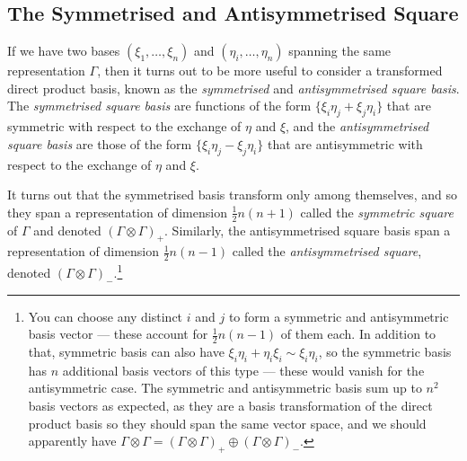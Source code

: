 \documentclass{article}
\theoremstyle{plain}\theoremheaderfont{\normalfont\itshape}\theorembodyfont{\rmfamily}\theoremseparator{.}\newtheorem*{rem}{Remark}\newtheorem*{ex}{Example}\newtheorem*{proof}{Proof}\newtheorem*{altp}{Alternative proof}
\theoremstyle{plain}\theoremheaderfont{\normalfont\bfseries}\theorembodyfont{\rmfamily}\theoremseparator{.}\newtheorem{thm}{Theorem}[section]\newtheorem{lem}[thm]{Lemma}\newtheorem{prop}[thm]{Proposition}\newtheorem*{cor}{Corollary}\newtheorem{defn}[thm]{Definition}\newtheorem{clm}[thm]{Claim}\newtheorem{clminproof}{Claim}\newtheorem*{law}{Law}\newtheorem{pos}[thm]{Postulate}
\theoremstyle{break}\theoremheaderfont{\normalfont\itshape}\theorembodyfont{\rmfamily}\theoremseparator{.\medskip}\newtheorem*{proofskip}{Proof}\newtheorem*{exs}{Examples}\newtheorem*{rems}{Remarks}
\theoremstyle{break}\theoremheaderfont{\normalfont\bfseries}\theorembodyfont{\rmfamily}\theoremseparator{.\medskip}\newtheorem{lemskip}[thm]{Lemma}\newtheorem{defnskip}[thm]{Definition}\newtheorem{propskip}[thm]{Proposition}\newtheorem{thmskip}[thm]{Theorem}
\numberwithin{equation}{section}
\begin{document}
    \subsection{The Symmetrised and Antisymmetrised Square}
    If we have two bases \((\xi_1,\dots,\xi_n)\) and \((\eta_i,\dots,\eta_n)\) spanning the same representation \(\Gamma\), then it turns out to be more useful to consider a transformed direct product basis, known as the \textit{symmetrised} and \textit{antisymmetrised square basis}. The \textit{symmetrised square basis} are functions of the form \(\{\xi_i\eta_j+\xi_j\eta_i\}\) that are symmetric with respect to the exchange of \(\eta\) and \(\xi\), and the \textit{antisymmetrised square basis} are those of the form \(\{\xi_i\eta_j-\xi_j\eta_i\}\) that are antisymmetric with respect to the exchange of \(\eta\) and \(\xi\).

    It turns out that the symmetrised basis transform only among themselves, and so they span a representation of dimension \(\frac{1}{2}n(n+1)\) called the \textit{symmetric square} of \(\Gamma\) and denoted \((\Gamma\otimes\Gamma)_+\). Similarly, the antisymmetrised square basis span a representation of dimension \(\frac{1}{2}n(n-1)\) called the \textit{antisymmetrised square}, denoted \((\Gamma\otimes\Gamma)_-\).\footnote{You can choose any distinct \(i\) and \(j\) to form a symmetric and antisymmetric basis vector --- these account for \(\frac{1}{2}n(n-1)\) of them each. In addition to that, symmetric basis can also have \(\xi_i\eta_i+\eta_i\xi_i\sim\xi_i\eta_i\), so the symmetric basis has \(n\) additional basis vectors of this type --- these would vanish for the antisymmetric case. The symmetric and antisymmetric basis sum up to \(n^2\) basis vectors as expected, as they are a basis transformation of the direct product basis so they should span the same vector space, and we should apparently have \(\Gamma\otimes\Gamma=(\Gamma\otimes\Gamma)_+\oplus(\Gamma\otimes\Gamma)_-\).}
\end{document}

